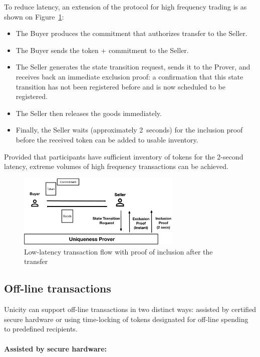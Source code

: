 \documentclass{article}
\begin{document}
To reduce latency, an extension of the protocol for high frequency trading is as shown on Figure~\ref{fig:LowLatency2}:
\begin{itemize}
  \item The Buyer produces the commitment that authorizes transfer to the Seller.
  \item The Buyer sends the token + commitment to the Seller.
  \item The Seller generates the state transition request, sends it to the Prover, and receives back an immediate exclusion proof: a confirmation that this state transition has not been registered before and is now scheduled to be registered.
  \item The Seller then releases the goods immediately.
  \item Finally, the Seller waits (approximately 2~seconds) for the inclusion proof before the received token can be added to usable inventory.
\end{itemize}

Provided that participants have sufficient inventory of tokens for the 2-second latency, extreme volumes of high frequency transactions can be achieved.

\begin{figure}[ht]
    \centering
    \includegraphics[width=0.7\textwidth]{LowLatency2.png}
    \caption{Low-latency transaction flow with proof of inclusion after the transfer}
    \label{fig:LowLatency2}
\end{figure}

\subsection{Off-line transactions}

Unicity can support off-line transactions in two distinct ways: assisted by certified secure hardware or using time-locking of tokens designated for off-line spending to predefined recipients.

\paragraph{Assisted by secure hardware:}
\end{document}
